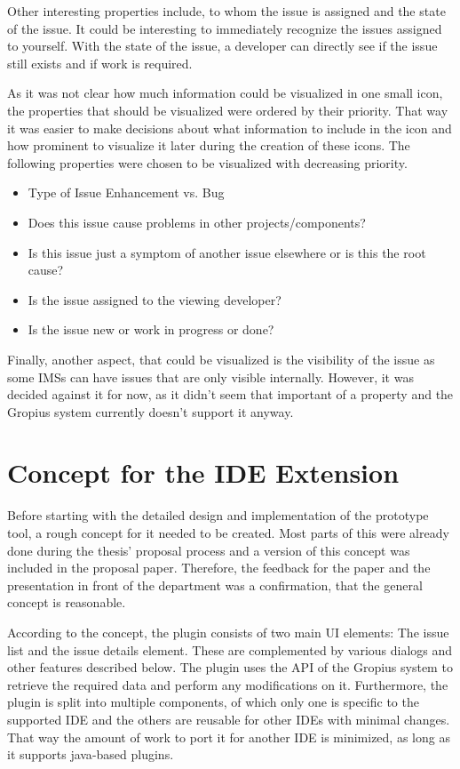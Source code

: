Other interesting properties include, to whom the issue is assigned and the state of the issue.
It could be interesting to immediately recognize the issues assigned to yourself.
With the state of the issue, a developer can directly see if the issue still exists and if work is required.

As it was not clear how much information could be visualized in one small icon, 
the properties that should be visualized were ordered by their priority.
That way it was easier to make decisions about what information to include in the icon and how prominent to visualize it later during the creation of these icons.
The following properties were chosen to be visualized with decreasing priority.
\begin{itemize}
	\item Type of Issue
	\subitem Enhancement vs. Bug
	\item Does this issue cause problems in other projects/components?
	\item Is this issue just a symptom of another issue elsewhere or is this the root cause?
	\item Is the issue assigned to the viewing developer?
	\item Is the issue new or work in progress or done?
\end{itemize}
Finally, another aspect, that could be visualized is the visibility of the issue as some \glspl{IMS} can have issues that are only visible internally.
However, it was decided against it for now, as it didn't seem that important of a property and the Gropius system currently doesn't support it anyway.

\section{Concept for the \gls{IDE} Extension}
\label{sec:ch3:s3}
Before starting with the detailed design and implementation of the prototype tool, a rough concept for it needed to be created.
Most parts of this were already done during the thesis' proposal process and a version of this concept was included in the proposal paper.
Therefore, the feedback for the paper and the presentation in front of the department was a confirmation, that the general concept is reasonable.

According to the concept, the plugin consists of two main \gls{UI} elements: The issue list and the issue details element.
These are complemented by various dialogs and other features described below.
The plugin uses the \gls{API} of the \gls{Gropius} system to retrieve the required data and perform any modifications on it.
Furthermore, the plugin is split into multiple components, 
of which only one is specific to the supported \gls{IDE} 
and the others are reusable for other \glspl{IDE} with minimal changes.
That way the amount of work to port it for another \gls{IDE} is minimized,
as long as it supports \gls{java}-based plugins.

